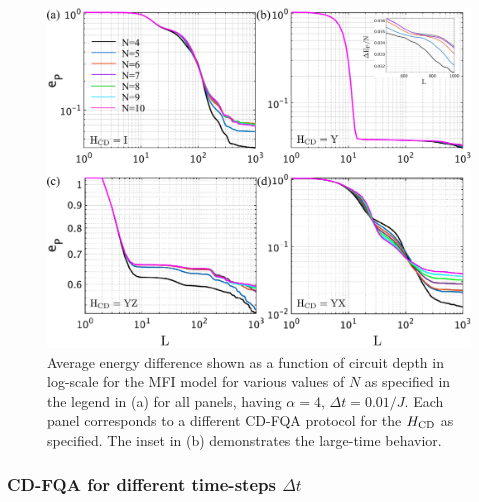 \documentclass[twocolumn,aps,superscriptaddress,floatfix,longbibliography]{revtex4-2}
\begin{document}


\begin{figure}
    \centering
    \includegraphics[scale=0.11]{N_final.pdf}
    \caption{Average energy difference shown as a function of circuit depth in log-scale for the MFI model
    for %
    various values of $N$ as specified in the
    legend in (a) for all panels,
    having $\alpha=4$, $\Delta t=0.01/J$. %
    Each panel %
    corresponds to a different CD-FQA protocol
    for the $H_{\rm CD}$ as specified.
    The inset in (b) demonstrates the large-time behavior.
}\label{fig:N_final}
\end{figure}

\subsubsection{CD-FQA for different time-steps $\Delta t$}
\end{document}

